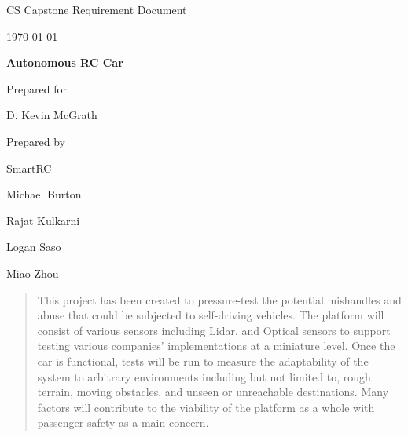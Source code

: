 \documentclass[onecolumn, draftclsnofoot,10pt]{IEEEtran}
\def \CapstoneTeamName{		    Team 42}
\def \GroupMemberOne{			Michael Burton}
\def \GroupMemberTwo{			Rajat Kulkarni}
\def \GroupMemberThree{			Logan Saso}
\def \GroupMemberFour{			Miao Zhou}
\def \CapstoneProjectName{		Autonomous RC Car}
\def \CapstoneSponsorPerson{	D. Kevin McGrath}
\def \DocType{	Requirement Document
				}
\newcommand{\NameSigPair}[1]{\par
\makebox[2.75in][r]{#1} \hfil 	\makebox[3.25in]{\makebox[2.25in]{\hrulefill} \hfill		\makebox[.75in]{\hrulefill}}
\par\vspace{-12pt} \textit{\tiny\noindent
\makebox[2.75in]{} \hfil		\makebox[3.25in]{\makebox[2.25in][r]{Signature} \hfill	\makebox[.75in][r]{Date}}}}
\renewcommand{\NameSigPair}[1]{#1}
\begin{document}
\begin{titlepage}
    \begin{singlespace}
        \hfill 
        \par\vspace{.2in}
        \centering
        \scshape{
            \huge CS Capstone \DocType \par
            {\large\today}\par
            \vspace{.5in}
            \textbf{\Huge\CapstoneProjectName}\par
            \vfill
            {\large Prepared for}\par
            \Huge \CapstoneSponsorCompany\par
            \vspace{5pt}
            {\Large\NameSigPair{\CapstoneSponsorPerson}\par}
            {\large Prepared by }\par
            SmartRC\par
            \vspace{5pt}
            {\Large
                \NameSigPair{\GroupMemberOne}\par
                \NameSigPair{\GroupMemberTwo}\par
                \NameSigPair{\GroupMemberThree}\par
                \NameSigPair{\GroupMemberFour}\par
            }
            \vspace{20pt}
        }
        \begin{abstract}
        This project has been created to pressure-test the potential mishandles and abuse that could be subjected to self-driving vehicles. The platform will consist of various sensors including Lidar, and Optical sensors to support testing various companies' implementations at a miniature level. Once the car is functional, tests will be run to measure the adaptability of the system to arbitrary environments including but not limited to, rough terrain, moving obstacles, and unseen or unreachable destinations. Many factors will contribute to the viability of the platform as a whole with passenger safety as a main concern. 
        \end{abstract}     
    \end{singlespace}
\end{titlepage}
\newpage
{}
\tableofcontents
\end{document}
